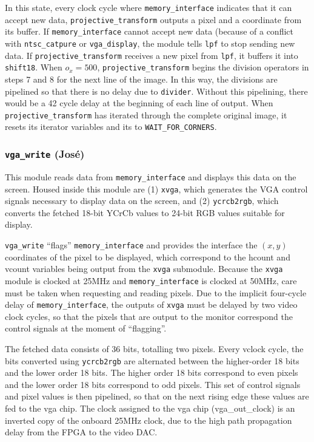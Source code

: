 \documentclass[10pt]{article}
\begin{document}
In this state, every clock cycle where {\tt memory\_interface} indicates that it can accept new data, {\tt projective\_transform} outputs a pixel and a coordinate from its buffer. If {\tt memory\_interface} cannot accept new data (because of a conflict with {\tt ntsc\_catpure} or {\tt vga\_display}, the module tells {\tt lpf} to stop sending new data. If {\tt projective\_transform} receives a new pixel from {\tt lpf}, it buffers it into {\tt shift18}. When $o_x = 500$, {\tt projective\_transform} begins the division operators in steps 7 and 8 for the next line of the image. In this way, the divisions are pipelined so that there is no delay due to {\tt divider}. Without this pipelining, there would be a 42 cycle delay at the beginning of each line of output. When {\tt projective\_transform} has iterated through the complete original image, it resets its iterator variables and its to {\tt WAIT\_FOR\_CORNERS}.

\subsubsection{{\tt vga\_write} (Jos\'{e})}
This module reads data from {\tt memory\_interface} and displays this data on the screen. Housed inside this module are (1) {\tt xvga}, which generates the VGA control signals necessary to display data on the screen, and (2) {\tt ycrcb2rgb}, which converts the fetched 18-bit YCrCb values to 24-bit RGB values suitable for display.

{\tt vga\_write} ``flags'' {\tt memory\_interface} and provides the interface the $(x,y)$ coordinates of the pixel to be displayed, which correspond to the hcount and vcount variables being output from the {\tt xvga} submodule. Because the {\tt xvga} module is clocked at 25MHz and {\tt memory\_interface} is clocked at 50MHz, care must be taken when requesting and reading pixels. Due to the implicit four-cycle delay of {\tt memory\_interface}, the outputs of {\tt xvga} must be delayed by two video clock cycles, so that the pixels that are output to the monitor correspond the control signals at the moment of ``flagging''. 

The fetched data consists of 36 bits, totalling two pixels. Every vclock cycle, the bits converted using {\tt ycrcb2rgb} are alternated between the higher-order 18 bits and the lower order 18 bits. The higher order 18 bits correspond to even pixels and the lower order 18 bits correspond to odd pixels. This set of control signals and pixel values is then pipelined, so that on the next rising edge these values are fed to the vga chip. The clock assigned to the vga chip (vga\_out\_clock) is an inverted copy of the onboard 25MHz clock, due to the high path propagation delay from the FPGA to the video DAC.
\end{document}
